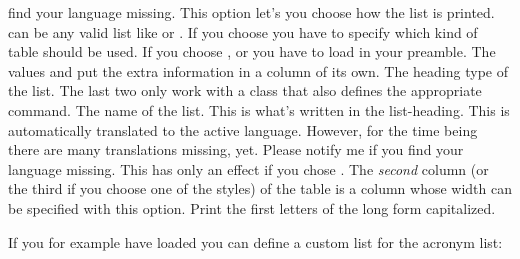 \documentclass[load-preamble+,scrartcl={DIV10}]{cnltx-doc}
\begin{document}
\begin{options}
    find your language missing.
    This option let's you choose how the list is printed.   can be
    any valid list like  or .
    If you choose  you have to specify which kind of
    table should be used.  If you choose ,
     or  you have to load
     in your preamble.  The values  and
     put the extra information in a column of its
    own.
  \null
    The heading type of the list. The last two only work
    with a \KOMAScript{} class that also defines the appropriate command.
    The name of the list.  This is what's written in the list-heading.  This
    is automatically translated to the active language.  However, for the time
    being there are many translations missing, yet.  Please notify me if you
    find your language missing.
    This has only an effect if you chose .  The
    \emph{second} column (or the third if you choose one of the 
    styles) of the table is a  column whose width can be specified
    with this option.
    Print the first letters of the long form capitalized.
 \end{options}
  
If you for example have loaded  you can define a custom list for
the acronym list:
\begin{sourcecode}
  \newcommand*\addcolon[1]{#1:}
  \printacronyms
\end{sourcecode}
\newcommand*\addcolon[1]{#1:}
\printacronyms
\end{document}
